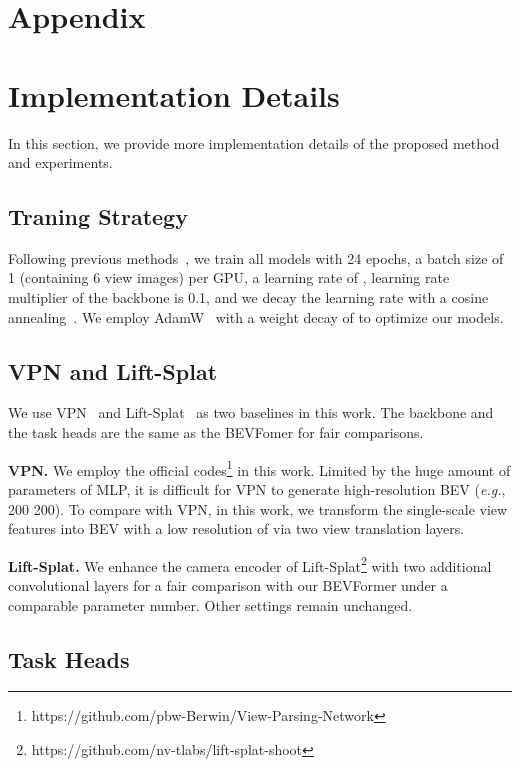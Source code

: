 \documentclass{article}
\def\eg{\emph{e.g.}}
\begin{document}
\section*{Appendix}
\appendix


\section{Implementation Details}
In this section, we provide more implementation details of the proposed method and experiments.

\subsection{Traning Strategy}





Following previous methods~\cite{wang2022detr3d,zhu2020deformable},
we train all models with 24 epochs, a batch size of 1 (containing 6 view images) per GPU, a learning rate of , learning rate multiplier of the backbone is 0.1, and we decay the learning rate with a cosine annealing~\cite{Loshchilov2017SGDRSG}. We employ AdamW~\cite{Loshchilov2019DecoupledWD} with a weight decay of  to optimize our models.

\subsection{VPN and Lift-Splat}
We use VPN~\cite{pan2020cross} and Lift-Splat~\cite{philion2020lift} as two baselines in this work. The backbone and the task heads are the same as the BEVFomer for fair comparisons.

\noindent\textbf{VPN.} We employ the official codes\footnote{https://github.com/pbw-Berwin/View-Parsing-Network} in this work. Limited by the huge amount of parameters of MLP, it is difficult for VPN to generate high-resolution BEV (\eg, 200 200).
To compare with VPN, in this work, we transform the single-scale view features into BEV with a low resolution of  
via two view translation layers.

\noindent\textbf{Lift-Splat.} We enhance the camera encoder of Lift-Splat\footnote{https://github.com/nv-tlabs/lift-splat-shoot} with two additional convolutional layers for a fair comparison with our BEVFormer under a comparable parameter number. Other settings remain unchanged.



\subsection{Task Heads} 
\end{document}
